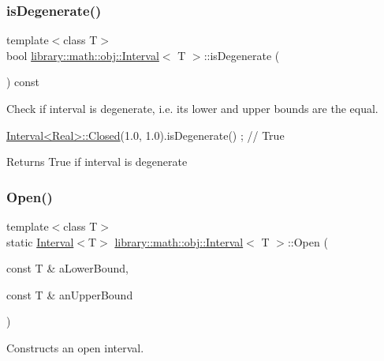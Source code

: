 \subsubsection{\texorpdfstring{is\+Degenerate()}{isDegenerate()}}
{\footnotesize\ttfamily template$<$class T$>$ \\
bool \hyperlink{classlibrary_1_1math_1_1obj_1_1_interval}{library\+::math\+::obj\+::\+Interval}$<$ T $>$\+::is\+Degenerate (\begin{DoxyParamCaption}{ }\end{DoxyParamCaption}) const}



Check if interval is degenerate, i.\+e. its lower and upper bounds are the equal. 


\begin{DoxyCode}
\hyperlink{classlibrary_1_1math_1_1obj_1_1_interval_aae8bb2b89af450729338d48563def4d7}{Interval<Real>::Closed}(1.0, 1.0).isDegenerate() ; \textcolor{comment}{// True}
\end{DoxyCode}


\begin{DoxyReturn}{Returns}
True if interval is degenerate 
\end{DoxyReturn}
\mbox{\label{classlibrary_1_1math_1_1obj_1_1_interval_add0e1114a0c153da7a928fd059a08919}} 
\subsubsection{\texorpdfstring{Open()}{Open()}}
{\footnotesize\ttfamily template$<$class T$>$ \\
static \hyperlink{classlibrary_1_1math_1_1obj_1_1_interval}{Interval}$<$T$>$ \hyperlink{classlibrary_1_1math_1_1obj_1_1_interval}{library\+::math\+::obj\+::\+Interval}$<$ T $>$\+::Open (\begin{DoxyParamCaption}\item[{const T \&}]{a\+Lower\+Bound,  }\item[{const T \&}]{an\+Upper\+Bound }\end{DoxyParamCaption})\hspace{0.3cm}{\ttfamily [static]}}



Constructs an open interval. 


